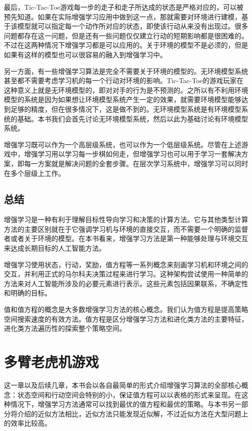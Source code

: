 \documentclass{ctexart}
\begin{document}
            最后，Tic-Tac-Toe游戏每一步的走子和走子所达成的状态是严格对应的，可以被预先知道。如果在实际增强学习应用中做到这一点，那就需要对环境进行建模，基于该模型就可以指定每一个动作所对应的状态，即使该行动从来没有出现过。很多问题都存在这一问题，但是还有一些问题仅仅建立行动的短期影响都是很困难的。不过在这两种情况下增强学习都是可以应用的。关于环境的模型不是必须的，但是如果有这样的模型也可以很容易的融入到增强学习中。

            另一方面，有一些增强学习算法是完全不需要关于环境的模型的。无环境模型系统甚至都不需要考虑学习机的每一个行动对环境的影响。Tic-Tac-Toe的游戏玩家在这种意义上就是无环境模型的，即对对手的行为是不预测的。之所以有不利用环境模型的系统是因为如果想让环境模型系统产生一定的效果，就需要环境模型能够达到足够的精度，但在很多情况下，这是做不到的。无环境模型系统是有环境模型系统的基础。本书我们会首先讨论无环境模型系统，然后以此为基础讨论有环境模型系统。

            增强学习既可以作为一个高层级系统，也可以作为一个低层级系统。尽管在上述游戏中，增强学习用以学习每一步棋如何走，但增强学习也可以用于学习一套解决方案，即每一方案就是解决问题的全套步骤。在层次学习系统中，增强学习可以同时在多个层级上工作。

        \subsection{总结}
            增强学习是一种有利于理解目标性导向学习和决策的计算方法。它与其他类型计算方法的主要区别就在于它强调学习机与环境的直接交互，而不需要一个明确的监督者或者关于环境的模型。在本书看来，增强学习方法是第一种能够处理与环境交互来达成长期目标的人工智能方法。

            增强学习使用状态，行动，奖励，值方程等一系列概念来刻画学习机和环境之间的交互，并利用正式的马尔科夫决策过程来进行学习。这种架构尝试使用一种简单的方法来对人工智能所涉及的必要元素进行表示。这些元素包括因果联系，不确定性和明确的目标。

            值和值方程的概念是大多数增强学习方法的核心概念。我们认为值方程是提高策略空间搜索速度的有效方法。值方程是区分增强学习方法和进化类方法的主要特征，进化类方法遍历性的探索整个策略空间。

    \section{多臂老虎机游戏}
        这一章以及后续几章，本书会以各自最简单的形式介绍增强学习算法的全部核心概念：状态空间和行动空间会特别的小，保证值方程可以以表格的形式来呈现。在这种情况下，增强学习方法通常可以找到最优的值方程和最优的策略。与本书另一部分将介绍的近似方法相比，近似方法只能发现近似解，不过近似方法在大型问题上的效率比较高。
\end{document}
